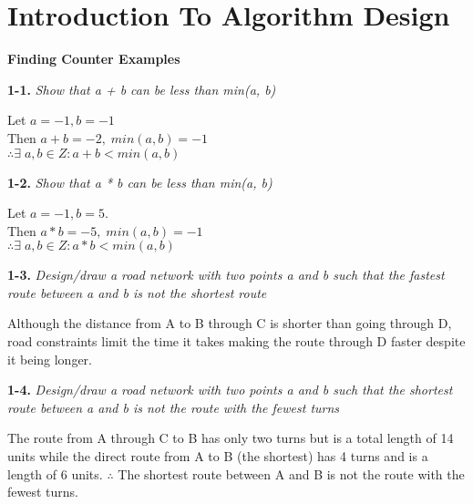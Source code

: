 \section{Introduction To Algorithm Design}

\textbf{Finding Counter Examples}

\textbf{1-1.} \emph{Show that a + b can be less than min(a, b)}
  \begin{center}
  Let $a = -1, b = -1$ \\ 
  Then $a + b = -2, \; min(a,b) = -1$ \\
  $\therefore \exists \; a, b \in Z : a+b < min(a,b)$
  \end{center}
  

\textbf{1-2.} \emph{Show that a * b can be less than min(a, b)}
  \begin{center}
  Let $a = -1, b = 5$. \\
  Then $a*b = -5, \; min(a,b) = -1$\\
  $\therefore \exists \; a, b \in Z : a*b < min(a,b)$
  \end{center}

\textbf{1-3.} \emph{Design/draw a road network with two points a and b such that the fastest route between a and b is not the shortest route}
	\begin{center}
	\end{center}
Although the distance from A to B through C is shorter than going through D, road constraints limit the time it takes making the route through D faster despite it being longer.



\textbf{1-4.} \emph{Design/draw a road network with two points a and b such that the shortest route between a and b is not the route with the fewest turns}
	\begin{center}
	\end{center}
The route from A through C to B has only two turns but is a total length of 14 units while the direct route from A to B (the shortest) has 4 turns and is a length of 6 units. $\therefore$ The shortest route between A and B is not the route with the fewest turns.

